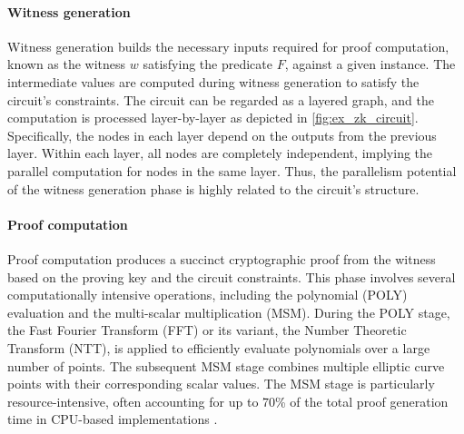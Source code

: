 \paragraph{Witness generation} Witness generation builds the necessary inputs required for proof computation, known as the witness $w$ satisfying the predicate $F$, against a given instance. 
The intermediate values are computed during witness generation to satisfy the circuit's constraints. The circuit can be regarded as a layered graph, and the computation is processed layer-by-layer as depicted in \cref{fig:ex_zk_circuit}. Specifically, the nodes in each layer depend on the outputs from the previous layer. Within each layer, all nodes are completely independent, implying the parallel computation for nodes in the same layer. Thus, the parallelism potential of the witness generation phase is highly related to the circuit's structure.






 



\paragraph{Proof computation} Proof computation produces a succinct cryptographic proof from the witness based on the proving key and the circuit constraints. This phase involves several computationally intensive operations, including the polynomial (POLY) evaluation and the multi-scalar multiplication (MSM). During the POLY stage, the Fast Fourier Transform (FFT) or its variant, the Number Theoretic Transform (NTT), is applied to efficiently evaluate polynomials over a large number of points. The subsequent MSM stage combines multiple elliptic curve points with their corresponding scalar values. The MSM stage is particularly resource-intensive, often accounting for up to 70\% of the total proof generation time in CPU-based \zk implementations \cite{ma2023gzkp}.







